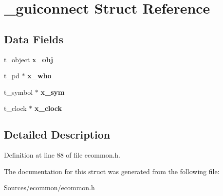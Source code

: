 \hypertarget{struct__guiconnect}{\section{\-\_\-guiconnect Struct Reference}
\label{struct__guiconnect}
}
\subsection*{Data Fields}
\begin{DoxyCompactItemize}
\item 
\hypertarget{struct__guiconnect_aec9b618f42517cd6740f1d37dba87d0a}{t\-\_\-object {\bfseries x\-\_\-obj}}\label{struct__guiconnect_aec9b618f42517cd6740f1d37dba87d0a}

\item 
\hypertarget{struct__guiconnect_abbd575f25ecf1fc4fc706f487f7bf433}{t\-\_\-pd $\ast$ {\bfseries x\-\_\-who}}\label{struct__guiconnect_abbd575f25ecf1fc4fc706f487f7bf433}

\item 
\hypertarget{struct__guiconnect_aac75f326262b21717e7625275550a9cc}{t\-\_\-symbol $\ast$ {\bfseries x\-\_\-sym}}\label{struct__guiconnect_aac75f326262b21717e7625275550a9cc}

\item 
\hypertarget{struct__guiconnect_a959680d1c5640f1e34e835dda3021eef}{t\-\_\-clock $\ast$ {\bfseries x\-\_\-clock}}\label{struct__guiconnect_a959680d1c5640f1e34e835dda3021eef}

\end{DoxyCompactItemize}


\subsection{Detailed Description}


Definition at line 88 of file ecommon.\-h.



The documentation for this struct was generated from the following file\-:\begin{DoxyCompactItemize}
\item 
Sources/ecommon/ecommon.\-h\end{DoxyCompactItemize}
